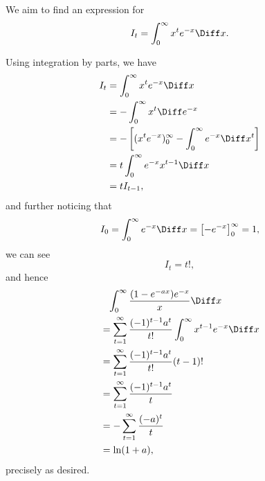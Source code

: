 \begin{enumerate}
          We aim to find an expression for
          \[
              I_t = \int_{0}^{\infty} x^{t} e^{-x} \Diff x.
          \]

          Using integration by parts, we have
          \begin{align*}
              I_t & = \int_{0}^{\infty} x^{t} e^{-x} \Diff x                                          \\
                  & = - \int_{0}^{\infty} x^{t} \Diff e^{-x}                                          \\
                  & = - \left[(x^t e^{-x})_{0}^{\infty} - \int_{0}^{\infty} e^{-x} \Diff x^{t}\right] \\
                  & = t \int_{0}^{\infty} e^{-x} x^{t - 1} \Diff x                                    \\
                  & = t I_{t - 1},
          \end{align*}
          and further noticing that
          \[
              I_0 = \int_{0}^{\infty} e^{-x} \Diff x = \left[-e^{-x}\right]_{0}^{\infty} = 1,
          \]
          we can see
          \[
              I_t = t!,
          \]
          and hence
          \begin{align*}
               & \phantom{=}\int_{0}^{\infty} \frac{(1 - e^{-ax})e^{-x}}{x} \Diff x                             \\
               & = \sum_{t = 1}^{\infty} \frac{(-1)^{t - 1} a^t}{t!} \int_{0}^{\infty} x^{t - 1} e^{-x} \Diff x \\
               & =  \sum_{t = 1}^{\infty} \frac{(-1)^{t - 1} a^t}{t!} (t - 1)!                                  \\
               & = \sum_{t = 1}^{\infty} \frac{(-1)^{t - 1} a^t}{t}                                             \\
               & = - \sum_{t = 1}^{\infty} \frac{(-a)^t}{t}                                                     \\
               & = \ln (1 + a),
          \end{align*}
          precisely as desired.


\end{enumerate}
